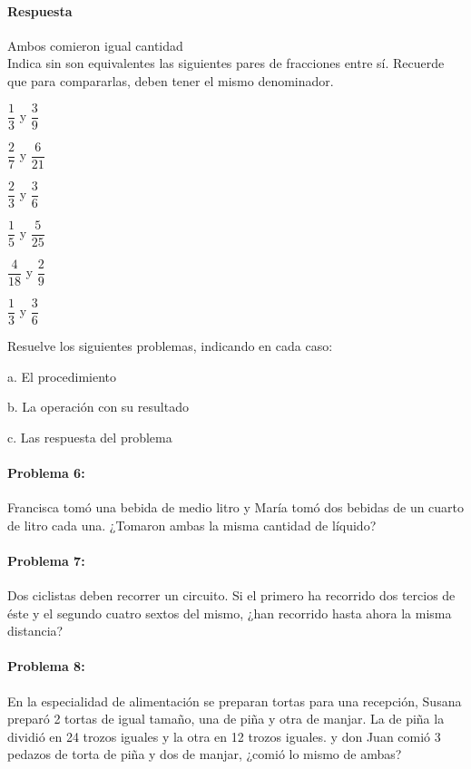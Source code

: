 \documentclass[10pt,twoside]{article}
\begin{document}
\paragraph*{Respuesta}
Ambos comieron igual cantidad\\
Indica sin son equivalentes las siguientes pares de fracciones entre sí. Recuerde que para compararlas, deben tener el mismo denominador.
\begin{itemize}
\begin{multicols}{3}
\item $\dfrac{1}{3}$ y $\dfrac{3}{9}$
\item $\dfrac{2}{7}$ y $\dfrac{6}{21}$
\item $\dfrac{2}{3}$ y $\dfrac{3}{6}$
\item $\dfrac{1}{5}$ y $\dfrac{5}{25}$
\item $\dfrac{4}{18}$ y $\dfrac{2}{9}$
\item $\dfrac{1}{3}$ y $\dfrac{3}{6}$
\end{multicols}
\end{itemize}
Resuelve los siguientes problemas, indicando en cada caso:
\begin{enumerate}\begin{multicols}{2}
\item[a.] El procedimiento
\item[b.] La operación con su resultado
\item[c.] Las respuesta del problema\end{multicols}
\end{enumerate}
\paragraph*{Problema 6:}
Francisca tomó una bebida de medio litro y María tomó dos bebidas de un cuarto de litro cada una. ¿Tomaron ambas la misma cantidad de líquido?
\paragraph*{Problema 7:}
Dos ciclistas deben recorrer un circuito. Si el primero ha recorrido dos tercios de éste y el segundo cuatro sextos del mismo, ¿han recorrido hasta ahora la misma distancia?
\paragraph*{Problema 8:} 
En la especialidad de alimentación se preparan tortas para una recepción, Susana preparó 2 tortas de igual tamaño, una de piña y otra de manjar. La de piña la dividió en 24 trozos
iguales y la otra en 12 trozos iguales. y don Juan comió 3 pedazos de torta de piña y dos de manjar, ¿comió lo mismo de ambas?
\end{document}
